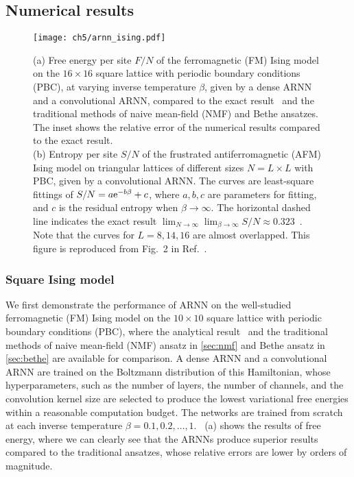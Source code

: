 \subsection{Numerical results}

\begin{figure}[htb]
\centering
\texttt{[image: ch5/arnn\_ising.pdf]}
\caption[ARNN results of Ising model on square and triangular lattices]{
(a) Free energy per site $F / N$ of the ferromagnetic (FM) Ising model on the $16 \times 16$ square lattice with periodic boundary conditions (PBC), at varying inverse temperature $\beta$, given by a dense ARNN and a convolutional ARNN, compared to the exact result~\cite{onsager1944crystal} and the traditional methods of naive mean-field (NMF) and Bethe ansatzes.
The inset shows the relative error of the numerical results compared to the exact result. \\
(b) Entropy per site $S / N$ of the frustrated antiferromagnetic (AFM) Ising model on triangular lattices of different sizes $N = L \times L$ with PBC, given by a convolutional ARNN.
The curves are least-square fittings of $S / N = a \mathrm{e}^{-b \beta} + c$, where $a, b, c$ are parameters for fitting, and $c$ is the residual  entropy when $\beta \to \infty$.
The horizontal dashed line indicates the exact result $\lim_{N \to \infty} \lim_{\beta \to \infty} S / N \approx 0.323$~\cite{wannier1950antiferromagnetism, wannier1973antiferromagnetism}.
Note that the curves for $L = 8, 14, 16$ are almost overlapped.
This figure is reproduced from Fig.~2 in Ref.~\cite{wu2019solving}.
}
\label{fig:arnn-ising}
\end{figure}

\subsubsection{Square Ising model}

We first demonstrate the performance of ARNN on the well-studied ferromagnetic (FM) Ising model on the $10 \times 10$ square lattice with periodic boundary conditions (PBC), where the analytical result~\cite{onsager1944crystal} and the traditional methods of naive mean-field (NMF) ansatz in \cref{sec:nmf} and Bethe ansatz in \cref{sec:bethe} are available for comparison. A dense ARNN and a convolutional ARNN are trained on the Boltzmann distribution of this Hamiltonian, whose hyperparameters, such as the number of layers, the number of channels, and the convolution kernel size are selected to produce the lowest variational free energies within a reasonable computation budget. The networks are trained from scratch at each inverse temperature $\beta = 0.1, 0.2, \ldots, 1$. ~(a) shows the results of free energy, where we can clearly see that the ARNNs produce superior results compared to the traditional ansatzes, whose relative errors are lower by orders of magnitude.

